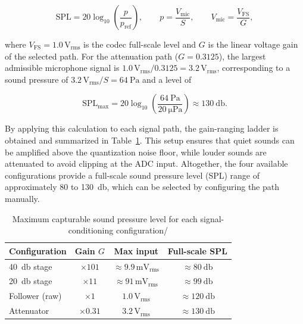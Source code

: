 \begin{equation}
  \mathrm{SPL} = 20 \log_{10}\!\left(\frac{p}{p_{\text{ref}}}\right), \qquad p = \frac{V_{\text{mic}}}{S}, \qquad V_{\text{mic}} = \frac{V_{\text{FS}}}{G},
  \label{eq:afe_spl}
\end{equation}

where $V_{\text{FS}} = 1.0\,\mathrm{V_{rms}}$ is the codec full-scale level and $G$ is the linear voltage gain of the selected path. For the attenuation path ($G = 0.3125$), the largest admissible microphone signal is $1.0\,\mathrm{V_{rms}} / 0.3125 = 3.2\,\mathrm{V_{rms}}$, corresponding to a sound pressure of $3.2\,\mathrm{V_{rms}} / S = \SI{64}{\pascal}$ and a level of

\begin{equation}
  \mathrm{SPL}_{\max} = 20 \log_{10}\!\left(\frac{\SI{64}{\pascal}}{\SI{20}{\micro\pascal}}\right) \approx \SI{130}{\decibel}.
  \label{eq:afe_splmax}
\end{equation}


By applying this calculation to each signal path,  the gain-ranging ladder is obtained and summarized in Table~\ref{tab:gain_ranging}. This setup ensures that quiet sounds can be amplified above the quantization noise floor, while louder sounds are attenuated to avoid clipping at the ADC input. Altogether, the four available configurations provide a full-scale sound pressure level (SPL) range of approximately \SI{80}{} to \SI{130}{\decibel}, which can be selected by configuring the path manually.

\begin{table}[h!]
\centering
\begin{tabular}{|l|c|c|c|}
\hline
\textbf{Configuration} & \textbf{Gain $G$} & \textbf{Max input} & \textbf{Full-scale SPL} \\
\hline
\SI{40}{\decibel} stage   & $\times 101$   & $\approx 9.9\,\mathrm{mV_{rms}}$ & $\approx \SI{80}{\decibel}$ \\\hline
\SI{20}{\decibel} stage   & $\times 11$    & $\approx 91\,\mathrm{mV_{rms}}$ & $\approx \SI{99}{\decibel}$ \\\hline
Follower (raw)            & $\times 1$     & $1.0\,\mathrm{V_{rms}}$         & $\approx \SI{120}{\decibel}$ \\\hline
Attenuator                & $\times 0.31$  & $3.2\,\mathrm{V_{rms}}$         & $\approx \SI{130}{\decibel}$ \\

\hline
\end{tabular}
\caption{Maximum capturable sound pressure level for each signal-conditioning configuration/}
\label{tab:gain_ranging}
\end{table}

